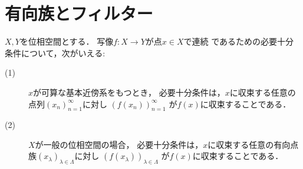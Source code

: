 \section{有向族とフィルター}
	\begin{screen}
		\begin{thm}[有向点族による連続性の特徴づけ]
			$X,Y$を位相空間とする．
			写像$f:X \longrightarrow Y$が点$x \in X$で連続
			であるための必要十分条件について，次がいえる:
			\begin{description}
				\item[(1)] $x$が可算な基本近傍系をもつとき，
					必要十分条件は，$x$に収束する任意の点列$(x_n)_{n=1}^{\infty}$に対し
					$\left( f(x_n) \right)_{n=1}^\infty$
					が$f(x)$に収束することである．
					
				\item[(2)] $X$が一般の位相空間の場合，
					必要十分条件は，$x$に収束する任意の有向点族$(x_\lambda)_{\lambda \in \Lambda}$に対し
					$\left( f(x_\lambda) \right)_{\lambda \in \Lambda}$
					が$f(x)$に収束することである．
			\end{description}
		\end{thm}
	\end{screen}
	
